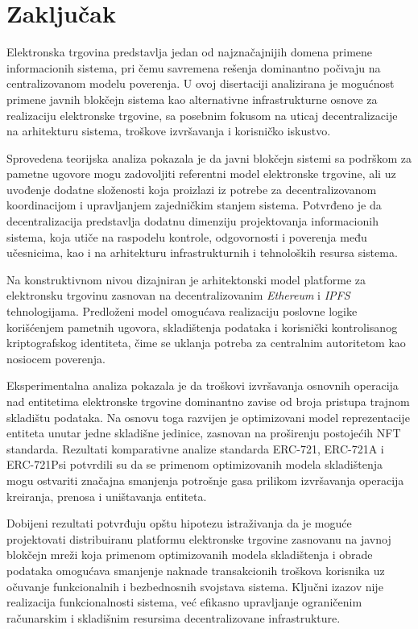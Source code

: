 \chapter{Zaključak}
Elektronska trgovina predstavlja jedan od najznačajnijih domena primene informacionih sistema, pri čemu savremena rešenja dominantno počivaju na centralizovanom modelu poverenja. U ovoj disertaciji analizirana je mogućnost primene javnih blokčejn sistema kao alternativne infrastrukturne osnove za realizaciju elektronske trgovine, sa posebnim fokusom na uticaj decentralizacije na arhitekturu sistema, troškove izvršavanja i korisničko iskustvo.

Sprovedena teorijska analiza pokazala je da javni blokčejn sistemi sa podrškom za pametne ugovore mogu zadovoljiti referentni model elektronske trgovine, ali uz uvođenje dodatne složenosti koja proizlazi iz potrebe za decentralizovanom koordinacijom i upravljanjem zajedničkim stanjem sistema. Potvrđeno je da decentralizacija predstavlja dodatnu dimenziju projektovanja informacionih sistema, koja utiče na raspodelu kontrole, odgovornosti i poverenja među učesnicima, kao i na arhitekturu infrastrukturnih i tehnoloških resursa sistema.

Na konstruktivnom nivou dizajniran je arhitektonski model platforme za elektronsku trgovinu zasnovan na decentralizovanim \textit{Ethereum} i \textit{IPFS} tehnologijama. Predloženi model omogućava realizaciju poslovne logike korišćenjem pametnih ugovora, skladištenja podataka i korisnički kontrolisanog kriptografskog identiteta, čime se uklanja potreba za centralnim autoritetom kao nosiocem poverenja.

Eksperimentalna analiza pokazala je da troškovi izvršavanja osnovnih operacija nad entitetima elektronske trgovine dominantno zavise od broja pristupa trajnom skladištu podataka. Na osnovu toga razvijen je optimizovani model reprezentacije entiteta unutar jedne skladišne jedinice, zasnovan na proširenju postojećih NFT standarda. Rezultati komparativne analize standarda ERC-721, ERC-721A i ERC-721Psi potvrdili su da se primenom optimizovanih modela skladištenja mogu ostvariti značajna smanjenja potrošnje gasa prilikom izvršavanja operacija kreiranja, prenosa i uništavanja entiteta.

Dobijeni rezultati potvrđuju opštu hipotezu istraživanja da je moguće projektovati distribuiranu platformu elektronske trgovine zasnovanu na javnoj blokčejn mreži koja primenom optimizovanih modela skladištenja i obrade podataka omogućava smanjenje naknade transakcionih troškova korisnika uz očuvanje funkcionalnih i bezbednosnih svojstava sistema. Ključni izazov nije realizacija funkcionalnosti sistema, već efikasno upravljanje ograničenim računarskim i skladišnim resursima decentralizovane infrastrukture.

